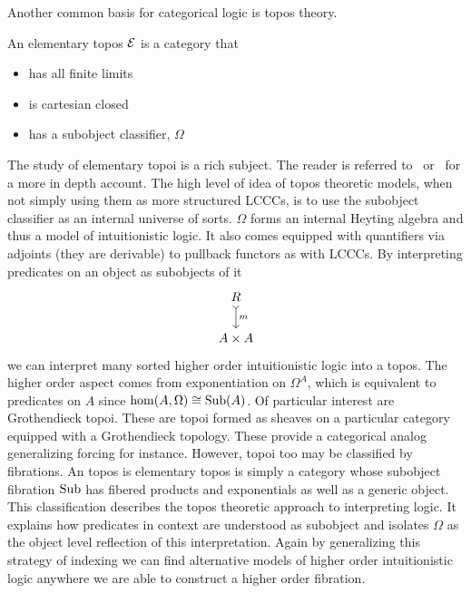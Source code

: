 Another common basis for categorical logic is topos theory.
\begin{defn}\label{defn:othersemantics:topos}
  An elementary topos $\mathcal{E}{}$ is a category that
  \begin{itemize}
  \item has all finite limits
  \item is cartesian closed
  \item has a subobject classifier, $\Omega$
  \end{itemize}
\end{defn}
The study of elementary topoi is a rich subject. The reader is referred
to~\citet{MacLane:94} or~\citet{Johnstone:14} for a more in depth
account. The high level of idea of topos theoretic models, when not
simply using them as more structured LCCCs, is to use the subobject
classifier as an internal universe of sorts. $\Omega$ forms an
internal Heyting algebra and thus a model of intuitionistic logic. It
also comes equipped with quantifiers via adjoints (they are derivable)
to pullback functors as with LCCCs. By interpreting predicates on an
object as subobjects of it
\[
  \begin{tikzcd}
    R \ar[d, rightarrowtail, "m"]\\
    A \times A
  \end{tikzcd}
\]
we can interpret many sorted higher order intuitionistic logic into a
topos. The higher order aspect comes from exponentiation on
$\Omega^A$, which is equivalent to predicates on $A$ since
$\hom(A, \Omega) \cong \operatorname{Sub}(A)$. Of particular interest are
Grothendieck topoi. These are topoi formed as sheaves on a particular
category equipped with a Grothendieck topology. These provide a
categorical analog generalizing forcing for instance. However, topoi
too may be classified by fibrations. An topos is elementary topos is
simply a category whose subobject fibration $\operatorname{Sub}$ has fibered
products and exponentials as well as a generic object. This
classification describes the topos theoretic approach to interpreting
logic. It explains how predicates in context are understood as
subobject and isolates $\Omega$ as the object level reflection of this
interpretation. Again by generalizing this strategy of indexing we can
find alternative models of higher order intuitionistic logic anywhere
we are able to construct a higher order fibration.

